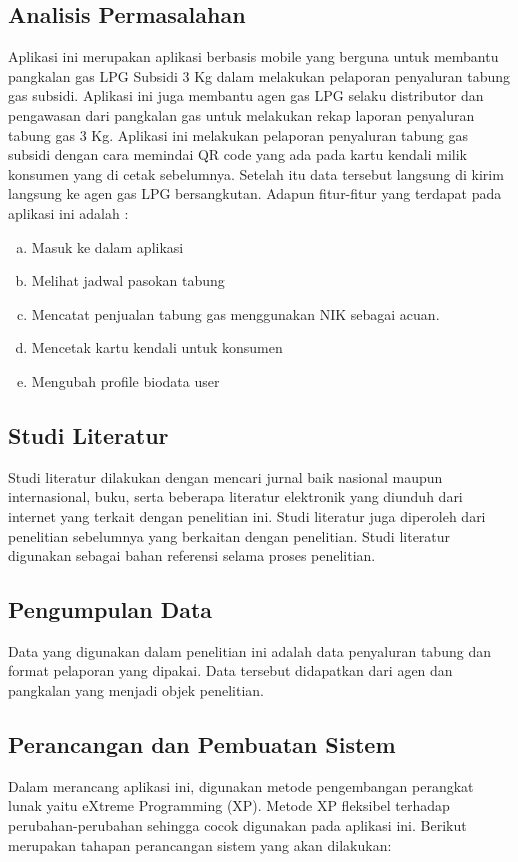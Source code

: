 \subsection{Analisis Permasalahan}
Aplikasi ini merupakan aplikasi berbasis mobile yang berguna untuk membantu pangkalan gas LPG Subsidi 3 Kg dalam melakukan pelaporan penyaluran tabung gas subsidi. Aplikasi ini juga membantu agen gas LPG selaku distributor dan pengawasan dari pangkalan gas untuk melakukan rekap laporan penyaluran tabung gas 3 Kg. Aplikasi ini melakukan pelaporan penyaluran tabung gas subsidi dengan cara memindai QR code yang ada pada kartu kendali milik konsumen yang di cetak sebelumnya. Setelah itu data tersebut langsung di kirim langsung ke agen gas LPG bersangkutan. Adapun fitur-fitur yang terdapat pada aplikasi ini adalah :
\begin{enumerate}[a.]
		\item Masuk ke dalam aplikasi
		\item Melihat jadwal pasokan tabung 
		\item Mencatat penjualan tabung gas menggunakan NIK sebagai acuan.
		\item Mencetak kartu kendali untuk konsumen
		\item Mengubah profile biodata user
\end{enumerate}

\subsection{Studi Literatur}
Studi literatur dilakukan dengan mencari jurnal baik nasional maupun internasional, buku, serta beberapa literatur elektronik yang diunduh dari internet yang terkait dengan penelitian ini. Studi literatur juga diperoleh dari penelitian sebelumnya yang berkaitan dengan penelitian. Studi literatur digunakan sebagai bahan referensi selama proses penelitian.

\subsection{Pengumpulan Data}
Data yang digunakan dalam penelitian ini adalah data penyaluran tabung dan format pelaporan yang dipakai. Data tersebut didapatkan dari agen dan pangkalan yang menjadi objek penelitian.

\subsection{Perancangan dan Pembuatan Sistem}
Dalam merancang aplikasi ini, digunakan metode pengembangan perangkat lunak yaitu eXtreme Programming (XP). Metode XP fleksibel terhadap perubahan-perubahan sehingga cocok digunakan pada aplikasi ini. Berikut merupakan tahapan perancangan sistem yang akan dilakukan:

